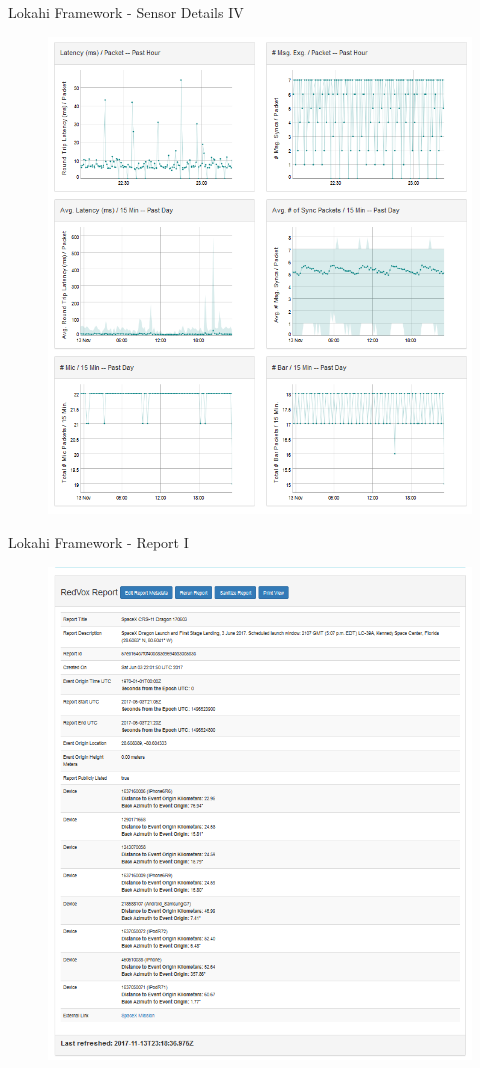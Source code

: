 \documentclass{beamer}
\begin{document}
\begin{frame}{Lokahi Framework - Sensor Details IV}
\begin{figure}
	\includegraphics[width=.60\textwidth]{img/redvox4.png}
\end{figure}
\end{frame}

\begin{frame}{Lokahi Framework - Report I}
\begin{figure}
	\includegraphics[width=.60\textwidth]{img/report1.png}
\end{figure}
\end{frame}
\end{document}
